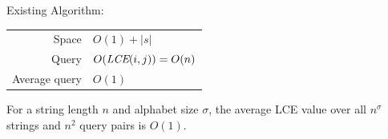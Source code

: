 \documentclass{beamer}
\begin{document}
\begin{frame}{Existing Algorithm: }
    \begin{tabular}{r l}
        Space & $O(1)+|s|$ \\
        Query & $O(\textit{LCE}(i,j))=O(n)$ \\
        Average query & $O(1)$ \\
    \end{tabular}

    \vspace{1cm}
    For a string length $n$ and alphabet size $\sigma$, the average LCE value over all $n^\sigma$ strings and $n^2$ query pairs is $O(1)$.
    \bibs
\end{frame}

\end{document}
